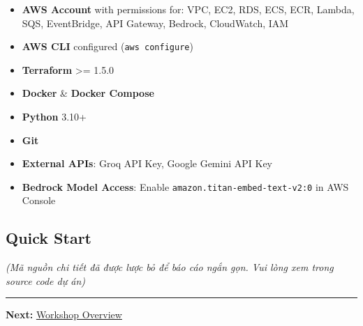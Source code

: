 \begin{itemize}
\tightlist
\item
  \textbf{AWS Account} with permissions for: VPC, EC2, RDS, ECS, ECR,
  Lambda, SQS, EventBridge, API Gateway, Bedrock, CloudWatch, IAM
\item
  \textbf{AWS CLI} configured (\texttt{aws\ configure})
\item
  \textbf{Terraform} \textgreater= 1.5.0
\item
  \textbf{Docker} \& \textbf{Docker Compose}
\item
  \textbf{Python} 3.10+
\item
  \textbf{Git}
\item
  \textbf{External APIs}: Groq API Key, Google Gemini API Key
\item
  \textbf{Bedrock Model Access}: Enable
  \texttt{amazon.titan-embed-text-v2:0} in AWS Console
\end{itemize}

\hypertarget{quick-start}{%
\subsection{Quick Start}}

\emph{(Mã nguồn chi tiết đã được lược bỏ để báo cáo ngắn gọn. Vui lòng
xem trong source code dự án)}

\begin{center}\rule{0.5\linewidth}{0.5pt}\end{center}

\textbf{Next:} \href{5.1-Workshop-overview/}{Workshop Overview}
